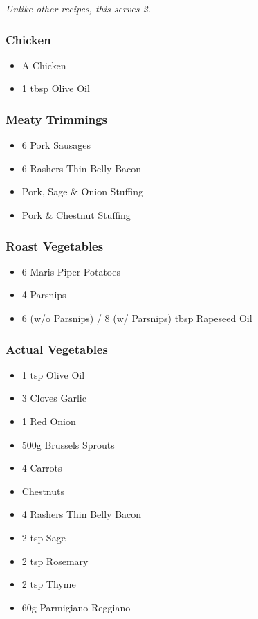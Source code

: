 \documentclass[11pt, english]{article}
\begin{document}
	\textit{Unlike other recipes, this serves 2.}

		\subsubsection*{Chicken}

	\begin{itemize}
        \setlength\itemsep{0cm}
		\item A Chicken
		\item 1 tbsp Olive Oil
	\end{itemize}

		\subsubsection*{Meaty Trimmings}

	\begin{itemize}
        \setlength\itemsep{0cm}
		\item 6 Pork Sausages
		\item 6 Rashers Thin Belly Bacon
		\item Pork, Sage \& Onion Stuffing
		\item Pork \& Chestnut Stuffing
	\end{itemize}

		\subsubsection*{Roast Vegetables}

	\begin{itemize}
        \setlength\itemsep{0cm}
		\item 6 Maris Piper Potatoes
		\item 4 Parsnips
		\item 6 (w/o Parsnips) / 8 (w/ Parsnips) tbsp Rapeseed Oil 
	\end{itemize}

		\subsubsection*{Actual Vegetables}

	\begin{itemize}
        \setlength\itemsep{0cm}
		\item 1 tsp Olive Oil
		\item 3 Cloves Garlic
		\item 1 Red Onion
		\item 500g Brussels Sprouts
		\item 4 Carrots
		\item Chestnuts
		\item 4 Rashers Thin Belly Bacon
		\item 2 tsp Sage
		\item 2 tsp Rosemary
		\item 2 tsp Thyme
		\item 60g Parmigiano Reggiano
	\end{itemize}
\end{document}
